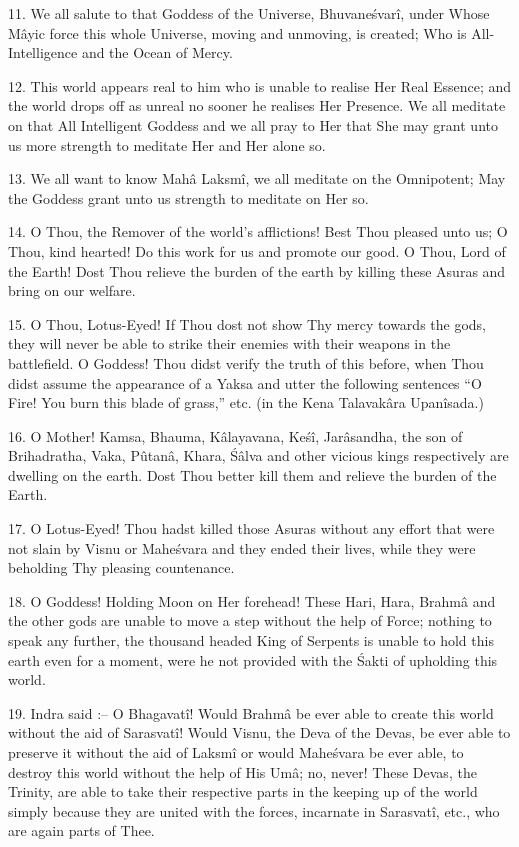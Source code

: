 11. We all salute to that Goddess of the Universe, Bhuvane\'svar\^i, under Whose M\^ayic force this whole Universe, moving and unmoving, is created; Who is All-Intelligence and the Ocean of Mercy.

12. This world appears real to him who is unable to realise Her Real Essence; and the world drops off as unreal no sooner he realises Her Presence. We all meditate on that All Intelligent Goddess and we all pray to Her that She may grant unto us more strength to meditate Her and Her alone so.

13. We all want to know Mah\^a Laksm\^i, we all meditate on the Omnipotent; May the Goddess grant unto us strength to meditate on Her so.

14. O Thou, the Remover of the world's afflictions! Best Thou pleased unto us; O Thou, kind hearted! Do this work for us and promote our good. O Thou, Lord of the Earth! Dost Thou relieve the burden of the earth by killing these Asuras and bring on our welfare.

15. O Thou, Lotus-Eyed! If Thou dost not show Thy mercy towards the gods, they will never be able to strike their enemies with their weapons in the battlefield. O Goddess! Thou didst verify the truth of this before, when Thou didst assume the appearance of a Yaksa and utter the following sentences ``O Fire! You burn this blade of grass,'' etc. (in the Kena Talavak\^ara Upan\^isada.)

16. O Mother! Kamsa, Bhauma, K\^alayavana, Ke\'s\^i, Jar\^asandha, the son of Brihadratha, Vaka, Pûtan\^a, Khara, \'S\^alva and other vicious kings respectively are dwelling on the earth. Dost Thou better kill them and relieve the burden of the Earth.

17. O Lotus-Eyed! Thou hadst killed those Asuras without any effort that were not slain by Visnu or Mahe\'svara and they ended their lives, while they were beholding Thy pleasing countenance.

18. O Goddess! Holding Moon on Her forehead! These Hari, Hara, Brahm\^a and the other gods are unable to move a step without the help of Force; nothing to speak any further, the thousand headed King of Serpents is unable to hold this earth even for a moment, were he not provided with the \'Sakti of upholding this world.

19. Indra said :-- O Bhagavat\^i! Would Brahm\^a be ever able to create this world without the aid of Sarasvat\^i! Would Visnu, the Deva of the Devas, be ever able to preserve it without the aid of Laksm\^i or would Mahe\'svara be ever able, to destroy this world without the help of His Um\^a; no, never! These Devas, the Trinity, are able to take their respective parts in the keeping up of the world simply because they are united with the forces, incarnate in Sarasvat\^i, etc., who are again parts of Thee.

